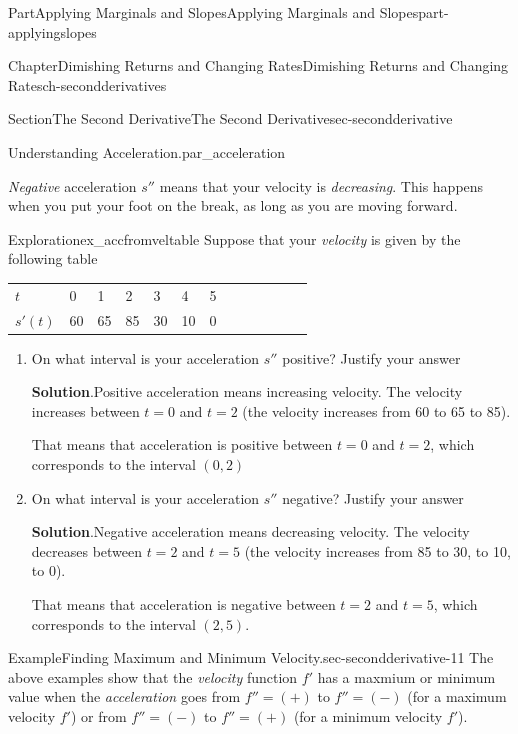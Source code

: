 \documentclass[oneside,10pt,]{tufte-book}
\newcommand{\blocktitlefont}{\relax}
\newcommand{\tabularfont}{\relax}
\numberwithin{equation}{chapter}
\newcommand{\hrulemedium}{\noalign{\hrule height 0.07em}}
\begin{document}
\begin{partptx}{Part}{Applying Marginals and Slopes}{}{Applying Marginals and Slopes}{}{}{part-applyingslopes}
\begin{chapterptx}{Chapter}{Dimishing Returns and Changing Rates}{}{Dimishing Returns and Changing Rates}{}{}{ch-secondderivatives}
\begin{sectionptx}{Section}{The Second Derivative}{}{The Second Derivative}{}{}{sec-secondderivative}
\begin{paragraphs}{Understanding Acceleration.}{par_acceleration}
\par
\emph{Negative} acceleration \(s''\) means that your velocity is \emph{decreasing}.  This happens when you put your foot on the break, as long as you are moving forward.%
\end{paragraphs}%
\begin{exploration}{Exploration}{}{ex_accfromveltable}%
Suppose that your \emph{velocity} is given by the following table \begin{center}%
{\tabularfont%
\begin{tabular}{lBlBlBlBlBlBl}
\(t\)&0&1&2&3&4&5\tabularnewline\hrulemedium
\(s'(t)\)&60&65&85&30&10&0
\end{tabular}
}%
\end{center}%
%
\begin{enumerate}[font=\bfseries,label=(\alph*),ref=\alph*]%
\item{}On what interval is your acceleration \(s''\) positive? Justify your answer%
\par\smallskip%
\noindent\textbf{\blocktitlefont Solution}.\hypertarget{ex_accfromveltable-2-2}{}\quad{}Positive acceleration means increasing velocity. The velocity increases between \(t=0\) and \(t=2\) (the velocity increases from 60 to 65 to 85).%
\par
That means that acceleration is positive between \(t=0\) and \(t=2\), which corresponds to the interval \((0,2)\)%
\item{}On what interval is your acceleration \(s''\) negative? Justify your answer%
\par\smallskip%
\noindent\textbf{\blocktitlefont Solution}.\hypertarget{ex_accfromveltable-3-2}{}\quad{}Negative acceleration means decreasing velocity. The velocity decreases between \(t=2\) and \(t=5\) (the velocity increases from 85 to 30, to 10, to 0).%
\par
That means that acceleration is negative between \(t=2\) and \(t=5\), which corresponds to the interval \((2,5)\).%
\end{enumerate}%
\end{exploration}%
\begin{example}{Example}{Finding Maximum and Minimum Velocity.}{sec-secondderivative-11}%
The above examples show that the \emph{velocity} function \(f'\) has a maxmium or minimum value when the \emph{acceleration} goes from \(f''=(+)\) to \(f''=(-)\) (for a maximum velocity \(f'\)) or from \(f''=(-)\) to \(f''=(+)\) (for a minimum velocity \(f'\)).%
\end{example}
\end{sectionptx}

\end{chapterptx}
\end{partptx}
\end{document}
